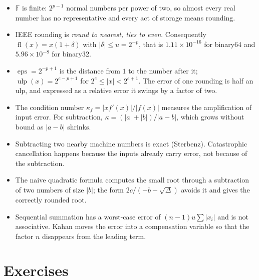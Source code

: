 \begin{ringkasan}
\begin{itemize}
  \item $\mathbb{F}$ is finite: $2^{p-1}$ normal numbers per power of two, so
        almost every real number has no representative and every act of storage means
        rounding.
  \item IEEE rounding is \emph{round to nearest, ties to even}. Consequently
        $\operatorname{fl}(x)=x(1+\delta)$ with $|\delta|\le u=2^{-p}$, that is
        $1.11\times10^{-16}$ for binary64 and $5.96\times10^{-8}$ for
        binary32.
  \item $\operatorname{eps}=2^{-p+1}$ is the distance from $1$ to the number after it;
        $\operatorname{ulp}(x)=2^{e-p+1}$ for $2^{e}\le|x|<2^{e+1}$. The error of one
        rounding is half an ulp, and expressed as a relative error it swings by
        a factor of two.
  \item The condition number $\kappa_{f}=|xf'(x)|/|f(x)|$ measures the amplification of
        input error. For subtraction, $\kappa=(|a|+|b|)/|a-b|$, which grows without
        bound as $|a-b|$ shrinks.
  \item Subtracting two nearby machine numbers is exact (Sterbenz). Catastrophic
        cancellation happens because the inputs already carry error, not because of
        the subtraction.
  \item The naive quadratic formula computes the small root through a subtraction of two
        numbers of size $|b|$; the form $2c/(-b-\sqrt{\Delta})$ avoids it and gives the
        correctly rounded root.
  \item Sequential summation has a worst-case error of $(n-1)u\sum|x_{i}|$ and is not
        associative. Kahan moves the error into a compensation variable so that the
        factor $n$ disappears from the leading term.
\end{itemize}
\end{ringkasan}

\section{Exercises}

